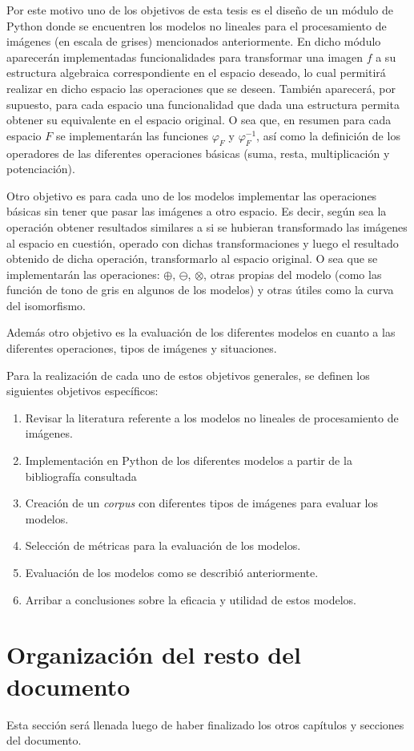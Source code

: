 Por este motivo uno de los objetivos de esta tesis es el dise\~no de un m\'odulo de Python donde se encuentren los modelos no lineales para el procesamiento de im\'agenes (en escala de grises) mencionados anteriormente. En dicho m\'odulo aparecer\'an implementadas funcionalidades para transformar una imagen $f$ a su estructura algebraica correspondiente en el espacio deseado, lo cual permitir\'a realizar en dicho espacio las operaciones que se deseen. Tambi\'en aparecer\'a, por supuesto, para cada espacio una funcionalidad que dada una estructura permita obtener su equivalente en el espacio original. O sea que, en resumen para cada espacio $F$ se implementar\'an las funciones $\varphi_F$ y $\varphi^{-1}_F$, as\'i como la definici\'on de los operadores de las diferentes operaciones b\'asicas (suma, resta, multiplicaci\'on y potenciaci\'on).

Otro objetivo es para cada uno de los modelos implementar las operaciones b\'asicas sin tener que pasar las im\'agenes a otro espacio. Es decir, seg\'un sea la operaci\'on obtener resultados similares a si se hubieran transformado las im\'agenes al espacio en cuesti\'on, operado con dichas transformaciones y luego el resultado obtenido de dicha operaci\'on, transformarlo al espacio original. O sea que se implementar\'an las operaciones: $\oplus$, $\ominus$, $\otimes$, otras propias del modelo (como las funci\'on de tono de gris en algunos de los modelos) y otras \'utiles como la curva del isomorfismo.

Adem\'as otro objetivo es la evaluaci\'on de los diferentes modelos en cuanto a las diferentes operaciones, tipos de im\'agenes y situaciones.

Para la realizaci\'on de cada uno de estos objetivos generales, se definen los siguientes objetivos espec\'ificos:

\begin{enumerate}
	\item Revisar la literatura referente a los modelos no lineales de procesamiento de im\'agenes.
	\item Implementaci\'on en Python de los diferentes modelos a partir de la bibliograf\'ia consultada
	\item Creaci\'on de un \textit{corpus} con diferentes tipos de im\'agenes para evaluar los modelos.
	\item Selecci\'on de m\'etricas para la evaluaci\'on de los modelos.
	\item Evaluaci\'on de los modelos como se describi\'o anteriormente.
	\item Arribar a conclusiones sobre la eficacia y utilidad de estos modelos. 
\end{enumerate}

\section*{Organizaci\'on del resto del documento}

Esta secci\'on ser\'a llenada luego de haber finalizado los otros cap\'itulos y secciones del documento.